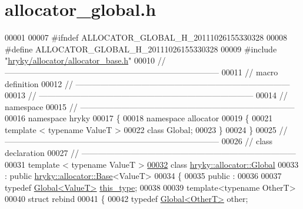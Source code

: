 \hypertarget{allocator__global_8h_source}{\section{allocator\-\_\-global.\-h}
}

\begin{DoxyCode}
00001 
00007 \textcolor{preprocessor}{#ifndef ALLOCATOR\_GLOBAL\_H\_20111026155330328}
00008 \textcolor{preprocessor}{}\textcolor{preprocessor}{#define ALLOCATOR\_GLOBAL\_H\_20111026155330328}
00009 \textcolor{preprocessor}{}\textcolor{preprocessor}{#include "\hyperlink{allocator__base_8h}{hryky/allocator/allocator_base.h}"}
00010 \textcolor{comment}{//
      ------------------------------------------------------------------------------}
00011 \textcolor{comment}{// macro definition}
00012 \textcolor{comment}{//
      ------------------------------------------------------------------------------}
00013 \textcolor{comment}{//
      ------------------------------------------------------------------------------}
00014 \textcolor{comment}{// namespace}
00015 \textcolor{comment}{//
      ------------------------------------------------------------------------------}
00016 \textcolor{keyword}{namespace }hryky
00017 \{
00018 \textcolor{keyword}{namespace }allocator
00019 \{
00021     \textcolor{keyword}{template} < \textcolor{keyword}{typename} ValueT >
00022     \textcolor{keyword}{class }Global;
00023 \}
00024 \}
00025 \textcolor{comment}{//
      ------------------------------------------------------------------------------}
00026 \textcolor{comment}{// class declaration}
00027 \textcolor{comment}{//
      ------------------------------------------------------------------------------}
00031 \textcolor{comment}{}\textcolor{keyword}{template} < \textcolor{keyword}{typename} ValueT >
\hypertarget{allocator__global_8h_source_l00032}{}\hyperlink{classhryky_1_1allocator_1_1_global}{00032} \textcolor{keyword}{class }\hyperlink{classhryky_1_1allocator_1_1_global}{hryky::allocator::Global}
00033     : \textcolor{keyword}{public} \hyperlink{classhryky_1_1allocator_1_1_base}{hryky::allocator::Base}<ValueT>
00034 \{
00035 \textcolor{keyword}{public} :
00036 
00037     \textcolor{keyword}{typedef} \hyperlink{classhryky_1_1allocator_1_1_global}{Global<ValueT>}          \hyperlink{classhryky_1_1allocator_1_1_base}{this_type};
00038 
00039     \textcolor{keyword}{template}<\textcolor{keyword}{typename} OtherT>
00040     \textcolor{keyword}{struct }rebind
00041     \{
00042         \textcolor{keyword}{typedef} \hyperlink{classhryky_1_1allocator_1_1_global}{Global<OtherT>}      other;

\end{DoxyCode}
